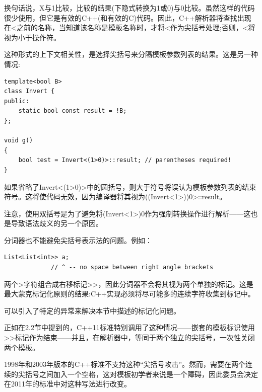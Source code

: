 换句话说，X与1比较，比较的结果(下隐式转换为1或0)与0比较。虽然这样的代码很少使用，但它是有效的C++(和有效的C)代码。因此，C++解析器将查找出现在<之前的名称，当知道该名称是模板名称时，才将<作为尖括号处理;否则，<将视为小于操作符。

这种形式的上下文相关性，是选择尖括号来分隔模板参数列表的结果。这是另一种情况:

\begin{lstlisting}[style=styleCXX]
template<bool B>
class Invert {
public:
	static bool const result = !B;
};

void g()
{
	bool test = Invert<(1>0)>::result; // parentheses required!
}
\end{lstlisting}

如果省略了Invert<(1>0)>中的圆括号，则大于符号将误认为模板参数列表的结束符号。这将使代码无效，因为编译器将其视为((Invert<1>))0>::result。

\begin{tcolorbox}[colback=webgreen!5!white,colframe=webgreen!75!black]
\hspace*{0.75cm}注意，使用双括号是为了避免将(Invert<1>)0作为强制转换操作进行解析——这也是导致语法歧义的另一个原因。
\end{tcolorbox}

分词器也不能避免尖括号表示法的问题。例如：

\begin{lstlisting}[style=styleCXX]
List<List<int>> a;
			 // ^ -- no space between right angle brackets
\end{lstlisting}

两个>字符组合成右移标记\textgreater{}\textgreater{}，因此分词器不会将其视为两个单独的标记。这是最大蒙克标记化原则的结果:C++实现必须将尽可能多的连续字符收集到标记中。

\begin{tcolorbox}[colback=webgreen!5!white,colframe=webgreen!75!black]
\hspace*{0.75cm}可以引入了特定的异常来解决本节中描述的标记化问题。
\end{tcolorbox}

正如在2.2节中提到的，C++11标准特别调用了这种情况——嵌套的模板标识使用\textgreater{}\textgreater{}标记作为结束——并且，在解析器中，等同于两个独立的尖括号，一次性关闭两个模板。

\begin{tcolorbox}[colback=webgreen!5!white,colframe=webgreen!75!black]
\hspace*{0.75cm}1998年和2003年版本的C++标准不支持这种“尖括号攻击”。然而，需要在两个连续的尖括号之间加入一个空格，这对模板初学者来说是一个障碍，因此委员会决定在2011年的标准中对这种写法进行改变。
\end{tcolorbox}

